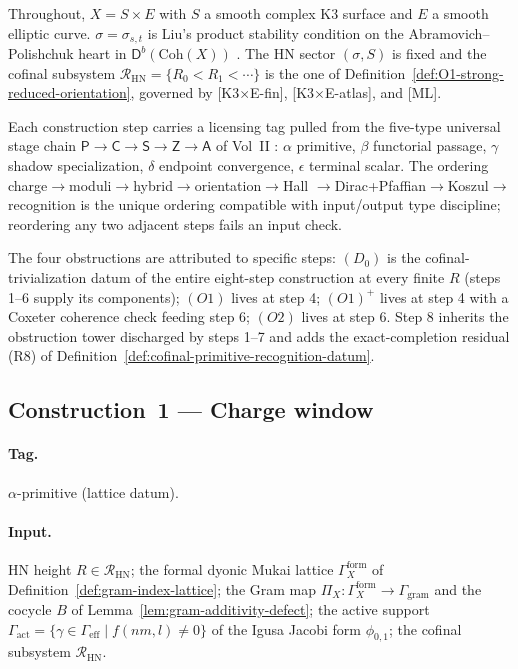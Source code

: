 Throughout, \(X=S\times E\) with \(S\) a smooth complex K3 surface and
\(E\) a smooth elliptic curve.  \(\sigma=\sigma_{s,t}\) is Liu's product
stability condition on the Abramovich--Polishchuk heart in
\(\mathsf{D}^b(\mathrm{Coh}(X))\)
\cite{AbramovichPolishchukTStructures,LiuProductStability}.  The HN
sector \((\sigma,S)\) is fixed and the cofinal subsystem
\(\mathcal R_{\mathrm{HN}}=\{R_0<R_1<\cdots\}\) is the one of
Definition~\ref{def:O1-strong-reduced-orientation}, governed by
\textup{[K3$\times$E-fin]}, \textup{[K3$\times$E-atlas]}, and
\textup{[ML]}.

Each construction step carries a licensing tag pulled from the
five-type universal stage chain
\(\mathsf P\to\mathsf C\to\mathsf S\to\mathsf Z\to\mathsf A\) of
Vol~II \cite{ChiralBarCobarVolII}: \(\alpha\) primitive,
\(\beta\) functorial passage, \(\gamma\) shadow specialization,
\(\delta\) endpoint convergence, \(\epsilon\) terminal scalar.  The
ordering charge\(\to\)moduli\(\to\)hybrid\(\to\)orientation\(\to\)Hall
\(\to\)Dirac+Pfaffian\(\to\)Koszul\(\to\)recognition is the unique
ordering compatible with input/output type discipline; reordering any
two adjacent steps fails an input check.

The four obstructions are attributed to specific steps:
\((D_0)\) is the cofinal-trivialization datum of the entire eight-step
construction at every finite \(R\) (steps 1--6 supply its components);
\((O1)\) lives at step 4; \((O1)^+\) lives at step 4 with a Coxeter
coherence check feeding step 6; \((O2)\) lives at step 6.  Step 8
inherits the obstruction tower discharged by steps 1--7 and adds the
exact-completion residual \textup{(R8)} of
Definition~\ref{def:cofinal-primitive-recognition-datum}.

\subsection{Construction~1 — Charge window}
\label{app:build-charge-window}

\paragraph{Tag.} \(\alpha\)-primitive (lattice datum).

\paragraph{Input.}
HN height \(R\in\mathcal R_{\mathrm{HN}}\); the formal dyonic Mukai
lattice \(\Gamma_X^{\mathrm{form}}\) of
Definition~\ref{def:gram-index-lattice}; the Gram map
\(\Pi_X:\Gamma_X^{\mathrm{form}}\to\Gamma_{\mathrm{gram}}\) and the
cocycle \(B\) of Lemma~\ref{lem:gram-additivity-defect}; the active
support \(\Gamma_{\mathrm{act}}=\{\gamma\in\Gamma_{\mathrm{eff}}\mid
f(nm,l)\ne0\}\) of the Igusa Jacobi form \(\phi_{0,1}\); the cofinal
subsystem \(\mathcal R_{\mathrm{HN}}\).

